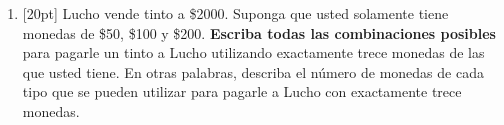\documentclass[11pt]{article}
\begin{document}
\begin{enumerate}
\vspace{6pt}
\noindent (a) [5pt]

\vspace{4pt}

\vspace{8pt}
\noindent (b) [5pt]

\vspace{4pt}

\item{}[20pt] Lucho vende tinto a \$2000. Suponga que usted solamente tiene monedas de \$50, \$100 y \$200. \textbf{Escriba todas las combinaciones posibles} para pagarle un tinto a Lucho utilizando exactamente trece monedas de las que usted tiene. En otras palabras, describa el número de monedas de cada tipo que se pueden utilizar para pagarle a Lucho con exactamente trece monedas.

\vspace{4pt}
\fbox{\begin{minipage}[t][4cm]{\dimexpr\linewidth-2\fboxsep-2\fboxrule}
\phantom{x}
\end{minipage}}


\end{enumerate}
\end{document}
